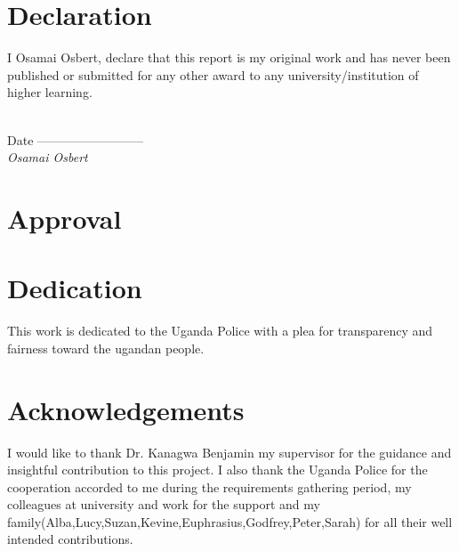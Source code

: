 \newpage
\tableofcontents
\newpage
\section*{Declaration}


{I Osamai Osbert, declare that this report is my original work and has never been published or submitted for any other award to any university/institution
of higher learning.}




\\{Date   --------------------------}\\

\noindent{}
{\it Osamai Osbert}

\pagestyle{plain}

\newpage
\section*{Approval}










\newpage
\section*{Dedication}

\noindent This work is dedicated to the Uganda Police with a plea for transparency and fairness toward the ugandan people.
\newpage
\section*{Acknowledgements}
\noindent I would like to thank Dr. Kanagwa Benjamin my supervisor for the guidance and insightful contribution to this project. I also thank the Uganda Police for the cooperation accorded to me during the requirements gathering period, my colleagues at university and work for the support and my family(Alba,Lucy,Suzan,Kevine,Euphrasius,Godfrey,Peter,Sarah) for all their well intended contributions.
\newpage
